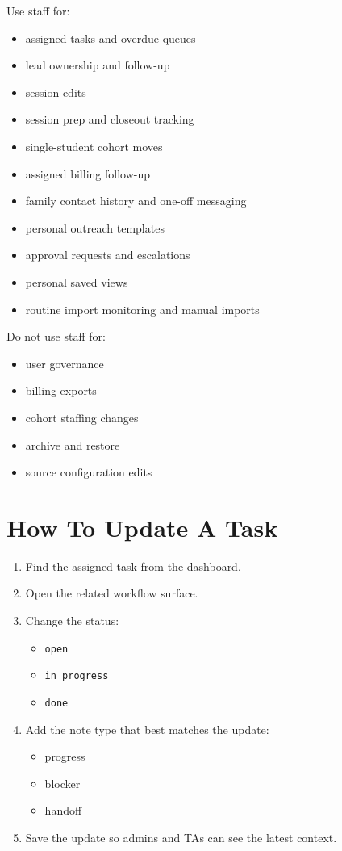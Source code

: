 \documentclass[11pt]{article}
\begin{document}
Use staff for:
\begin{itemize}
  \item assigned tasks and overdue queues
  \item lead ownership and follow-up
  \item session edits
  \item session prep and closeout tracking
  \item single-student cohort moves
  \item assigned billing follow-up
  \item family contact history and one-off messaging
  \item personal outreach templates
  \item approval requests and escalations
  \item personal saved views
  \item routine import monitoring and manual imports
\end{itemize}

Do not use staff for:
\begin{itemize}
  \item user governance
  \item billing exports
  \item cohort staffing changes
  \item archive and restore
  \item source configuration edits
\end{itemize}

\section*{How To Update A Task}
\begin{enumerate}
  \item Find the assigned task from the dashboard.
  \item Open the related workflow surface.
  \item Change the status:
  \begin{itemize}
    \item \texttt{open}
    \item \texttt{in\_progress}
    \item \texttt{done}
  \end{itemize}
  \item Add the note type that best matches the update:
  \begin{itemize}
    \item progress
    \item blocker
    \item handoff
  \end{itemize}
  \item Save the update so admins and TAs can see the latest context.
\end{enumerate}
\end{document}
